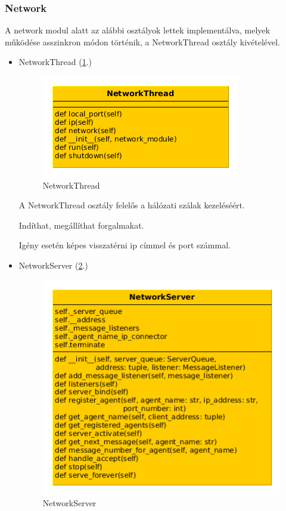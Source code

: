 \documentclass[a4paper,12pt,oneside]{report}
\begin{document}
\subsubsection{Network}

A network modul alatt az alábbi osztályok lettek implementálva, melyek működése asszinkron módon történik, a NetworkThread osztály kivételével.

\begin{itemize}
    \itemsep0em
        \item NetworkThread (\ref{fig:networkthread}.)
            \begin{figure}[h]
              \includegraphics[keepaspectratio]{networkthread.png}
              \caption{NetworkThread}
              \label{fig:networkthread}
            \end{figure}
            
            A NetworkThread osztály felelős a hálózati szálak kezeléséért.

            Indíthat, megállíthat forgalmakat.
            
            Igény esetén képes visszatérni ip címmel és port számmal.
            
            
        \item NetworkServer (\ref{fig:networkserver}.)
            \begin{figure}[h]
              \includegraphics[width=13cm, keepaspectratio]{networkserver.png}
              \caption{NetworkServer}
              \label{fig:networkserver}
            \end{figure}
   

\end{itemize}
\end{document}
